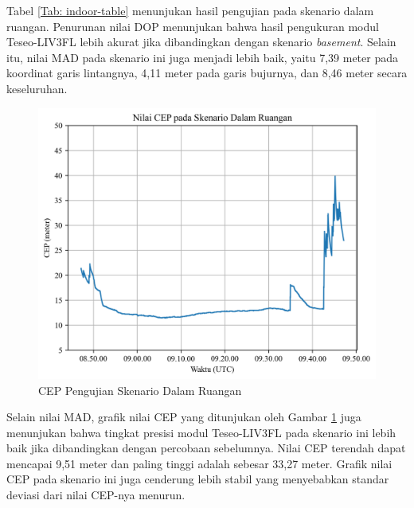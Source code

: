 Tabel \ref{Tab: indoor-table} menunjukan hasil pengujian pada skenario dalam ruangan. Penurunan nilai DOP menunjukan bahwa hasil pengukuran modul Teseo-LIV3FL lebih akurat jika dibandingkan dengan skenario \textit{basement}. Selain itu, nilai MAD pada skenario ini juga menjadi lebih baik, yaitu 7,39 meter pada koordinat garis lintangnya, 4,11 meter pada garis bujurnya, dan 8,46 meter secara keseluruhan.

\begin{figure}[H]
	\centering
	\includegraphics[width=13cm]{contents/chapter-4/2-skenario-indoor/cep.png}
	\caption{CEP Pengujian Skenario Dalam Ruangan}
	\label{Fig: indoor-cep}
\end{figure}

Selain nilai MAD, grafik nilai CEP yang ditunjukan oleh Gambar \ref{Fig: indoor-cep} juga menunjukan bahwa tingkat presisi modul Teseo-LIV3FL pada skenario ini lebih baik jika dibandingkan dengan percobaan sebelumnya. Nilai CEP terendah dapat mencapai 9,51 meter dan paling tinggi adalah sebesar 33,27 meter. Grafik nilai CEP pada skenario ini juga cenderung lebih stabil yang menyebabkan standar deviasi dari nilai CEP-nya menurun. 

